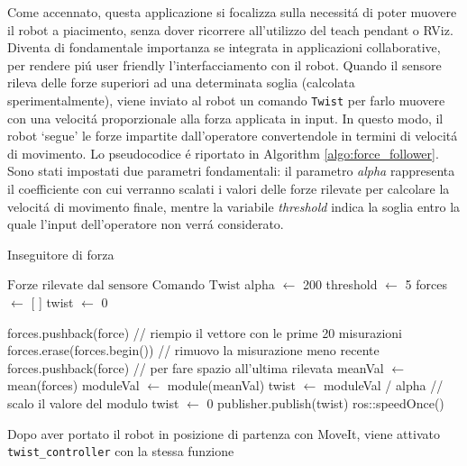 Come accennato, questa applicazione si focalizza sulla necessit\'{a} di poter muovere il robot a piacimento, senza dover 
ricorrere all'utilizzo del teach pendant o RViz. 
Diventa di fondamentale importanza se integrata in applicazioni collaborative, per rendere pi\'{u} user friendly l'interfacciamento 
con il robot. 
Quando il sensore rileva delle forze superiori ad una determinata soglia (calcolata sperimentalmente), viene inviato al robot un 
comando \verb|Twist| per farlo muovere con una velocit\'{a} proporzionale alla forza applicata in input. In questo modo, il robot `segue' 
le forze impartite dall'operatore convertendole in termini di velocit\'{a} di movimento\footnotemark{}. 
Lo pseudocodice \'{e} riportato in Algorithm \ref{algo:force_follower}. Sono stati impostati due parametri fondamentali: il parametro 
\textit{alpha} rappresenta il coefficiente con cui verranno scalati i valori delle forze rilevate per calcolare la velocit\'{a} di 
movimento finale, mentre la variabile \textit{threshold} indica la soglia entro la quale l'input dell'operatore non verr\'{a} 
considerato.
\begin{algorithm}[H]
\caption{Inseguitore di forza}\label{algo:force_follower}
\begin{algorithmic}[1]
    \Require $\text{Forze rilevate dal sensore}$
    \Ensure $\text{Comando Twist}$
    \State alpha $\gets$ 200
    \State threshold $\gets$ 5
    \State forces $\gets$ [ ]
    \State twist $\gets$ 0
    
        \State forces.pushback(force) // riempio il vettore con le prime 20 misurazioni
    \Else
        \State forces.erase(forces.begin()) // rimuovo la misurazione meno recente
        \State forces.pushback(force) // per fare spazio all'ultima rilevata
        \State meanVal $\gets$ mean(forces)
        \State moduleVal $\gets$ module(meanVal) 
            \State twist $\gets$ moduleVal / alpha // scalo il valore del modulo
        \Else
            \State twist $\gets$ 0
        \EndIf
        \State publisher.publish(twist)
    \EndIf
    \State ros::speedOnce()
    \EndWhile
\end{algorithmic}
\end{algorithm}
Dopo aver portato il robot in posizione di partenza con MoveIt, viene attivato \verb|twist_controller| con la stessa funzione 
